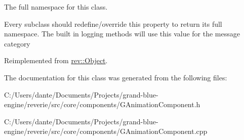 The full namespace for this class. 

Every subclass should redefine/override this property to return its full namespace. The built in logging methods will use this value for the message category 

Reimplemented from \mbox{\hyperlink{classrev_1_1_object_aaeb638d3e10f361c56c211a318a27f3d}{rev\+::\+Object}}.



The documentation for this class was generated from the following files\+:\begin{DoxyCompactItemize}
\item 
C\+:/\+Users/dante/\+Documents/\+Projects/grand-\/blue-\/engine/reverie/src/core/components/G\+Animation\+Component.\+h\item 
C\+:/\+Users/dante/\+Documents/\+Projects/grand-\/blue-\/engine/reverie/src/core/components/G\+Animation\+Component.\+cpp\end{DoxyCompactItemize}
